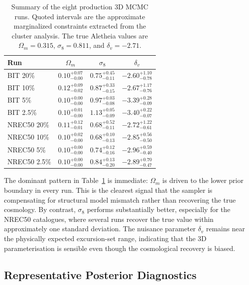 \documentclass[12pt]{report}
\begin{document}
\begin{table}[H]
    \centering
    \caption{Summary of the eight production 3D MCMC runs. Quoted intervals are the approximate marginalized constraints extracted from the cluster analysis. The true Aletheia values are $\Omega_m=0.315$, $\sigma_8=0.811$, and $\delta_v=-2.71$.}
    \label{tab:production_results}
    \begin{tabular}{lccc}
        \toprule
        \textbf{Run} & \textbf{$\Omega_m$} & \textbf{$\sigma_8$} & \textbf{$\delta_v$} \\
        \midrule
        BIT 20\%   & $0.10^{+0.07}_{-0.00}$ & $0.75^{+0.45}_{-0.11}$ & $-2.60^{+1.10}_{-0.78}$ \\
        BIT 10\%   & $0.12^{+0.09}_{-0.02}$ & $0.87^{+0.33}_{-0.15}$ & $-2.67^{+1.17}_{-0.76}$ \\
        BIT 5\%    & $0.10^{+0.00}_{-0.00}$ & $0.97^{+0.03}_{-0.08}$ & $-3.39^{+0.28}_{-0.09}$ \\
        BIT 2.5\%  & $0.10^{+0.01}_{-0.00}$ & $1.13^{+0.05}_{-0.09}$ & $-3.40^{+0.22}_{-0.07}$ \\
        NREC50 20\%  & $0.11^{+0.12}_{-0.01}$ & $0.68^{+0.52}_{-0.11}$ & $-2.72^{+1.22}_{-0.61}$ \\
        NREC50 10\%  & $0.10^{+0.02}_{-0.00}$ & $0.68^{+0.10}_{-0.13}$ & $-2.85^{+0.56}_{-0.50}$ \\
        NREC50 5\%   & $0.10^{+0.00}_{-0.00}$ & $0.74^{+0.12}_{-0.16}$ & $-2.96^{+0.59}_{-0.40}$ \\
        NREC50 2.5\% & $0.10^{+0.00}_{-0.00}$ & $0.84^{+0.13}_{-0.20}$ & $-2.89^{+0.70}_{-0.47}$ \\
        \bottomrule
    \end{tabular}
\end{table}

The dominant pattern in Table~\ref{tab:production_results} is immediate: $\Omega_m$ is driven to the lower prior boundary in every run. This is the clearest signal that the sampler is compensating for structural model mismatch rather than recovering the true cosmology. By contrast, $\sigma_8$ performs substantially better, especially for the NREC50 catalogues, where several runs recover the true value within approximately one standard deviation. The nuisance parameter $\delta_v$ remains near the physically expected excursion-set range, indicating that the 3D parameterisation is sensible even though the cosmological recovery is biased.

\subsection{Representative Posterior Diagnostics}
\end{document}
